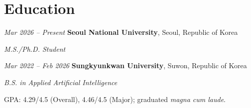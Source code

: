 \section{Education}

\begin{twocolentry}{\textit{Mar 2026 – Present}}
    \textbf{Seoul National University}, Seoul, Republic of Korea

    \textit{M.S./Ph.D. Student}
\end{twocolentry}

\vspace{0.2cm}

\begin{twocolentry}{\textit{Mar 2022 – Feb 2026}}
    \textbf{Sungkyunkwan University}, Suwon, Republic of Korea

    \textit{B.S. in Applied Artificial Intelligence}
\end{twocolentry}

\begin{onecolentry}
    \begin{highlights}
        \item GPA: 4.29/4.5 (Overall), 4.46/4.5 (Major); graduated \textit{magna cum laude}.
    \end{highlights}
\end{onecolentry}
